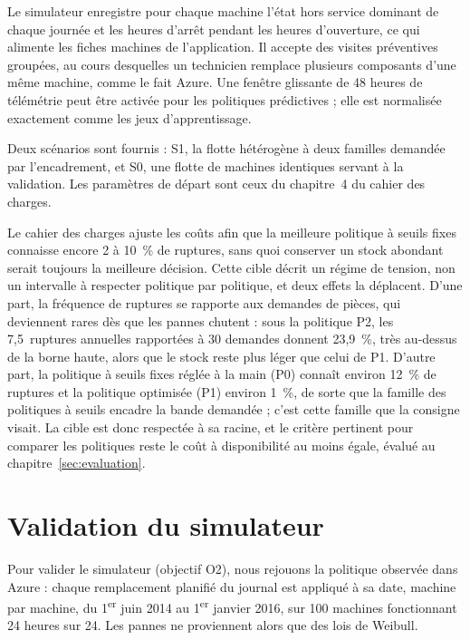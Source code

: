 \documentclass[11pt,a4paper,oneside]{report}
\newcommand{\intertitre}[1]{\par\vspace{0.3em}{\sffamily\bfseries\color{primaire}#1}\par\vspace{-0.2em}}
\begin{document}
Le simulateur enregistre pour chaque machine l'état hors service dominant de chaque journée et les heures d'arrêt pendant les heures d'ouverture, ce qui alimente les fiches machines de l'application. Il accepte des visites préventives groupées, au cours desquelles un technicien remplace plusieurs composants d'une même machine, comme le fait Azure. Une fenêtre glissante de 48 heures de télémétrie peut être activée pour les politiques prédictives ; elle est normalisée exactement comme les jeux d'apprentissage.

Deux scénarios sont fournis : S1, la flotte hétérogène à deux familles demandée par l'encadrement, et S0, une flotte de machines identiques servant à la validation. Les paramètres de départ sont ceux du chapitre~4 du cahier des charges.

\intertitre{La cible de ruptures du cahier des charges}
Le cahier des charges ajuste les coûts afin que la meilleure politique à seuils fixes connaisse encore 2 à 10~\% de ruptures, sans quoi conserver un stock abondant serait toujours la meilleure décision. Cette cible décrit un régime de tension, non un intervalle à respecter politique par politique, et deux effets la déplacent. D'une part, la fréquence de ruptures se rapporte aux demandes de pièces, qui deviennent rares dès que les pannes chutent : sous la politique P2, les 7,5~ruptures annuelles rapportées à 30 demandes donnent 23,9~\%, très au-dessus de la borne haute, alors que le stock reste plus léger que celui de P1. D'autre part, la politique à seuils fixes réglée à la main (P0) connaît environ 12~\% de ruptures et la politique optimisée (P1) environ 1~\%, de sorte que la famille des politiques à seuils encadre la bande demandée ; c'est cette famille que la consigne visait. La cible est donc respectée à sa racine, et le critère pertinent pour comparer les politiques reste le coût à disponibilité au moins égale, évalué au chapitre~\ref{sec:evaluation}.

\section{Validation du simulateur}\label{sec:validation}

Pour valider le simulateur (objectif O2), nous rejouons la politique observée dans Azure : chaque remplacement planifié du journal est appliqué à sa date, machine par machine, du 1\textsuperscript{er} juin 2014 au 1\textsuperscript{er} janvier 2016, sur 100 machines fonctionnant 24 heures sur 24. Les pannes ne proviennent alors que des lois de Weibull.
\end{document}
